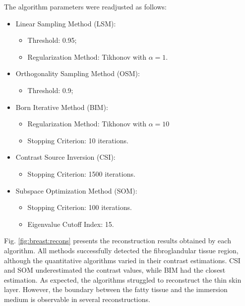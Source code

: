 \documentclass{ieeeaccess}
\begin{document}
        The algorithm parameters were readjusted as follows:
        \begin{itemize}
            \item Linear Sampling Method (LSM):
            \begin{itemize}
                \item Threshold: 0.95;
                \item Regularization Method: Tikhonov with $\alpha = 1$.
            \end{itemize}
            \item Orthogonality Sampling Method (OSM):
            \begin{itemize}
                \item Threshold: 0.9;
            \end{itemize}
            \item Born Iterative Method (BIM):
            \begin{itemize}
                \item Regularization Method: Tikhonov with $\alpha = 10$
                \item Stopping Criterion: 10 iterations.
            \end{itemize}
            \item Contrast Source Inversion (CSI):
            \begin{itemize}
                \item Stopping Criterion: 1500 iterations.
            \end{itemize}
            \item Subspace Optimization Method (SOM):
            \begin{itemize}
                \item Stopping Criterion: 100 iterations.
                \item Eigenvalue Cutoff Index: 15.
            \end{itemize}
        \end{itemize}

        Fig. \ref{fig:breast:recons} presents the reconstruction results obtained by each algorithm. All methods successfully detected the fibroglandular tissue region, although the quantitative algorithms varied in their contrast estimations. CSI and SOM underestimated the contrast values, while BIM had the closest estimation. As expected, the algorithms struggled to reconstruct the thin skin layer. However, the boundary between the fatty tissue and the immersion medium is observable in several reconstructions.
\end{document}

